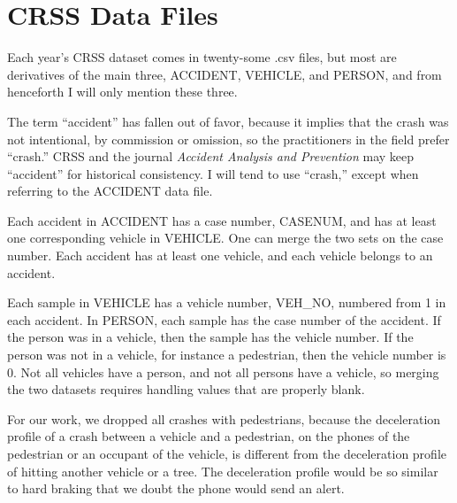 \section{CRSS Data Files}

Each year's CRSS dataset comes in twenty-some .csv files, but most are derivatives of the main three, ACCIDENT, VEHICLE, and PERSON, and from henceforth I will only mention these three.  

The term ``accident'' has fallen out of favor, because it implies that the crash was not intentional, by commission or omission, so the practitioners in the field prefer ``crash.''  CRSS and the journal {\it Accident Analysis and Prevention} may keep ``accident'' for historical consistency.  I will tend to use ``crash,'' except when referring to the ACCIDENT data file.

Each accident in ACCIDENT has a case number, CASENUM, and has at least one corresponding vehicle in VEHICLE.  One can merge the two sets on the case number.  Each accident has at least one vehicle, and each vehicle belongs to an accident.  

Each sample in VEHICLE has a vehicle number, VEH\_NO, numbered from 1 in each accident.  In PERSON, each sample has the case number of the accident.  If the person was in a vehicle, then the sample has the vehicle number.  If the person was not in a vehicle, for instance a pedestrian, then the vehicle number is 0.  Not all vehicles have a person, and not all persons have a vehicle, so merging the two datasets requires handling values that are properly blank.  

For our work, we dropped all crashes with pedestrians, because the deceleration profile of a crash between a vehicle and a pedestrian, on the phones of the pedestrian or an occupant of the vehicle, is different from the deceleration profile of hitting another vehicle or a tree.  The deceleration profile would be so similar to hard braking that we doubt the phone would send an alert.  

